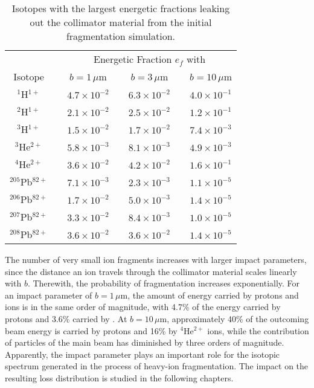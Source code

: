 %
%
\begin{table}[t]
\centering
\caption{Isotopes with the largest energetic fractions leaking out the collimator material from the initial fragmentation simulation. }
\small
\setlength\tabcolsep{2.5pt}
\label{tab:importance}
\begin{tabular}{ccccccc}
\toprule
          \multicolumn{1}{c}{}     &     &  \multicolumn{5}{c}{Energetic Fraction $e_f$ with}                    \\

\multicolumn{1}{c}{Isotope}       &   & \multicolumn{1}{c}{$b=1\,\mu$m} &            & \multicolumn{1}{c}{$b=3\,\mu$m}      &       & \multicolumn{1}{c}{$b=10\,\mu$m}            \\ \midrule
$^1$H$^{1+}$      & \phantom{a} & $4.7 \times 10^{-2}$ & \phantom{a} & $6.3 \times 10^{-2}$ & \phantom{a} & $4.0 \times 10^{-1}$  \\
$^2$H$^{1+}$      &  & $2.1 \times 10^{-2}$ & & $2.5 \times 10^{-2}$ & & $1.2 \times 10^{-1}$  \\
$^3$H$^{1+}$      &  & $1.5 \times 10^{-2}$ & & $1.7 \times 10^{-2}$ & & $7.4 \times 10^{-3}$  \\
$^3$He$^{2+}$     &  & $5.8 \times 10^{-3}$ & & $8.1 \times 10^{-3}$ & & $4.9 \times 10^{-3}$ \\
$^4$He$^{2+}$     &  & $3.6 \times 10^{-2}$ & & $4.2 \times 10^{-2}$ & & $1.6 \times 10^{-1}$  \\
$^{205}$Pb$^{82+}$&  & $7.1 \times 10^{-3}$ & & $2.3 \times 10^{-3}$ & & $1.1 \times 10^{-5}$  \\
$^{206}$Pb$^{82+}$&  & $1.7 \times 10^{-2}$ & & $5.0 \times 10^{-3}$ & & $ 1.4 \times 10^{-5}$ \\
$^{207}$Pb$^{82+}$&  & $3.3 \times 10^{-2}$ & & $ 8.4\times 10^{-3}$ & & $1.0 \times 10^{-5}$  \\
$^{208}$Pb$^{82+}$&  & $3.6 \times 10^{-2}$ & & $3.6\times 10^{-2}$  & & $1.4 \times 10^{-5}$  \\

\bottomrule
\end{tabular}
\end{table}
%
%
%


The number of very small ion fragments increases with larger impact parameters, since the distance an ion travels through the collimator material scales linearly with $b$. Therewith, the probability of fragmentation increases exponentially. For an impact parameter of $b=1\,\mu$m, the amount of energy carried by protons and \lead ions is in the same order of magnitude, with 4.7\% of the energy carried by protons and 3.6\% carried by \lead. At $b=10\,\mu$m, approximately 40\% of the outcoming beam energy is carried by protons and 16\% by $^4$He$^{2+}$ ions, while the contribution of particles of the main beam has diminished by three orders of magnitude. Apparently, the impact parameter plays an important role for the isotopic spectrum generated in the process of heavy-ion fragmentation. The impact on the resulting loss distribution is studied in the following chapters.




